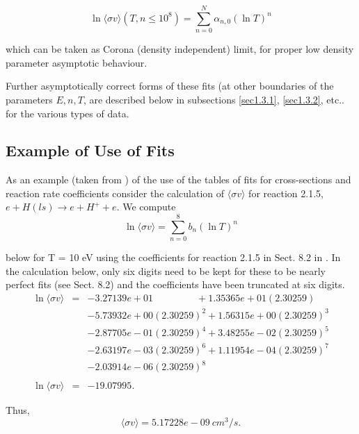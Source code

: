 \documentclass[12pt,dvipdfmx]{article}
\begin{document}
$$\ln \langle\sigma v\rangle(T, n\leq 10^8) = \sum_{n=0}^N \alpha_{n,0}(\ln T)^n$$

which can be taken as Corona (density independent) limit, for proper low density parameter asymptotic behaviour.

Further asymptotically correct forms of these fits (at other boundaries of the parameters $E, n, T$, are described below
in subsections \ref{sec1.3.1}, \ref{sec1.3.2}, etc.. for the various types of data.

\subsection{Example of Use of Fits}\label{sec1.1}

As an example (taken from \cite{kn:Janev}) of the use of the tables of fits for cross-sections and reaction rate coefficients consider
the calculation of $\langle\sigma v\rangle$ for reaction 2.1.5, $e + H(ls) \rightarrow e + H^+ + e$. We compute\\

      $$\ln \langle\sigma v\rangle = \sum_{n=0}^8 b_n(\ln T)^n$$

below for T = 10 eV using the coefficients for reaction 2.1.5 in Sect. 8.2 in \cite{kn:Janev}. In the calculation below, only
six digits need to be kept for these to be nearly perfect fits (see Sect. 8.2) and the coefficients have
been truncated at six digits.\\

\begin{eqnarray*}
\ln \langle\sigma v\rangle & = & -3.27139e+01 \quad\quad\quad\quad \ \ + 1.35365e+01 (2.30259)\\
& & -5.73932e+00 (2.30259)^2 + 1.56315e+00 (2.30259)^3\\
& & -2.87705e-01 (2.30259)^4 + 3.48255e-02 (2.30259)^5\\
& & -2.63197e-03 (2.30259)^6 + 1.11954e-04 (2.30259)^7\\
& & -2.03914e-06 (2.30259)^8\\
\\
\ln \langle\sigma v\rangle & = & -19.07995.
\end{eqnarray*}


Thus,\\

$$\langle\sigma v\rangle = 5.17228e-09  \ cm^3/s.$$
\end{document}
